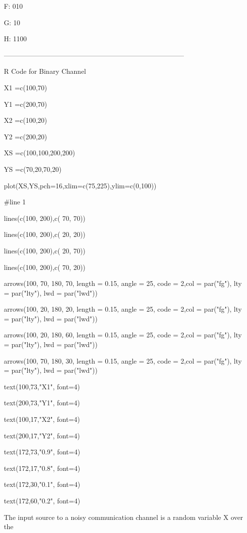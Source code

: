 F: 010

G: 10

H: 1100



--------------------------------------------------------------------------------


R Code for Binary Channel


X1 =c(100,70)

Y1 =c(200,70)

X2 =c(100,20)

Y2 =c(200,20)


XS =c(100,100,200,200)

YS =c(70,20,70,20)

plot(XS,YS,pch=16,xlim=c(75,225),ylim=c(0,100))


#line 1





lines(c(100, 200),c( 70, 70))

lines(c(100, 200),c( 20, 20))

lines(c(100, 200),c( 20, 70))

lines(c(100, 200),c( 70, 20))


arrows(100, 70, 180, 70, length = 0.15, angle = 25, code = 2,col = par("fg"), lty = par("lty"), lwd = par("lwd"))

arrows(100, 20, 180, 20, length = 0.15, angle = 25, code = 2,col = par("fg"), lty = par("lty"), lwd = par("lwd"))

arrows(100, 20, 180, 60, length = 0.15, angle = 25, code = 2,col = par("fg"), lty = par("lty"), lwd = par("lwd"))

arrows(100, 70, 180, 30, length = 0.15, angle = 25, code = 2,col = par("fg"), lty = par("lty"), lwd = par("lwd"))


text(100,73,"X1", font=4)

text(200,73,"Y1", font=4)

text(100,17,"X2", font=4)

text(200,17,"Y2", font=4)




text(172,73,"0.9", font=4)

text(172,17,"0.8", font=4)

text(172,30,"0.1", font=4)

text(172,60,"0.2", font=4)





The input source to a noisy communication channel is a random variable X over the

